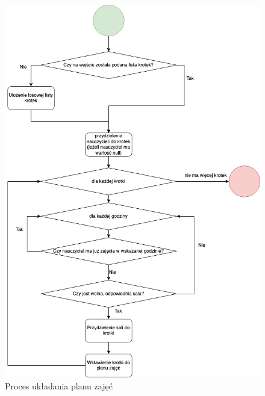 \begin{figure}[!ht]
\centering\includegraphics[width=\textwidth]{figures/time_table_prep}
\caption{Proces układania planu zajęć}\label{rys:time_table_prep}
\end{figure}


